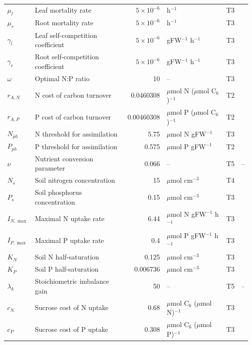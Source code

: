 \begin{table}[!htbp]
\begin{tabular}{@{}llrlll@{}}
$\mu_l$ & Leaf mortality rate & $5\times 10^{-6}$ & h$^{-1}$ & T3 & \citet{Tedone2020} \\
$\mu_r$ & Root mortality rate & $5\times 10^{-6}$ & h$^{-1}$ & T3 & \citet{Tedone2020} \\
$\gamma_l$ & Leaf self-competition coefficient & $5\times 10^{-6}$ & gFW$^{-1}$ h$^{-1}$ & T3 & \citet{Tedone2020} \\
$\gamma_r$ & Root self-competition coefficient & $5\times 10^{-6}$ & gFW$^{-1}$ h$^{-1}$ & T3 & \citet{Tedone2020} \\
$\omega$ & Optimal N:P ratio & 10 & -- & T3 & \citet{Tedone2020} \\
$r_{A,N}$ & N cost of carbon turnover & 0.0460308 & $\mu$mol N ($\mu$mol C$_6$)$^{-1}$ & T2 & \citet{Tedone2020} \\
$r_{A,P}$ & P cost of carbon turnover & 0.00460308 & $\mu$mol P ($\mu$mol C$_6$)$^{-1}$ & T2 & \citet{Tedone2020} \\
$N_{ph}$ & N threshold for assimilation & 5.75 & $\mu$mol N gFW$^{-1}$ & T3 & \citet{Tedone2020} \\
$P_{ph}$ & P threshold for assimilation & 0.575 & $\mu$mol P gFW$^{-1}$ & T2 & \citet{Tedone2020} \\
$\nu$ & Nutrient conversion parameter & 0.066 & -- & T5 & -- \\
$N_s$ & Soil nitrogen concentration & 15 & $\mu$mol cm$^{-3}$ & T4 & \citet{Tedone2020} \\
$P_s$ & Soil phosphorus concentration & 0.15 & $\mu$mol cm$^{-3}$ & T3 & \citet{Tedone2020} \\
$I_{N,\max}$ & Maximal N uptake rate & 6.44 & $\mu$mol N gFW$^{-1}$ h$^{-1}$ & T3 & \citet{Tedone2020} \\
$I_{P,\max}$ & Maximal P uptake rate & 0.4 & $\mu$mol P gFW$^{-1}$ h$^{-1}$ & T3 & \citet{Tedone2020} \\
$K_N$ & Soil N half-saturation & 0.125 & $\mu$mol cm$^{-3}$ & T3 & \citet{Tedone2020} \\
$K_P$ & Soil P half-saturation & 0.006736 & $\mu$mol cm$^{-3}$ & T3 & \citet{Tedone2020} \\
$\lambda_k$ & Stoichiometric imbalance gain & 50 & -- & T5 & -- \\
$c_N$ & Sucrose cost of N uptake & 0.68 & $\mu$mol C$_6$ ($\mu$mol N)$^{-1}$ & T3 & \citet{Tedone2020} \\
$c_P$ & Sucrose cost of P uptake & 0.308 & $\mu$mol C$_6$ ($\mu$mol P)$^{-1}$ & T3 & \citet{Tedone2020} \\

\end{tabular}
\end{table}
